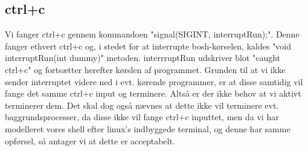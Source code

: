 \subsection{ctrl+c}
Vi fanger ctrl+c gennem kommandoen "signal(SIGINT, interruptRun);". Denne fanger ethvert ctrl+c og, i stedet for at interrupte bosh-kørselen, kaldes "void interruptRun(int dummy)" metoden. interrruptRun udskriver blot "caught ctrl+c" og fortsætter herefter kørslen af programmet. Grunden til at vi ikke sender interruptet videre ned i evt. kørende programmer, er at disse samtidig vil fange det samme ctrl+c input og terminere. Altså er der ikke behov at vi aktivt terminerer dem. Det skal dog også nævnes at dette ikke vil terminere evt. baggrundsprocesser, da disse ikke vil fange ctrl+c inputtet, men da vi har modelleret vores shell efter linux's indbyggede terminal, og denne har samme opførsel, så antager vi at dette er acceptabelt. 

